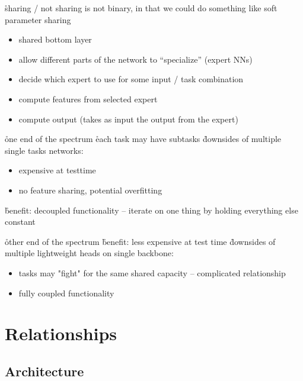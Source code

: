 \r{sharing / not sharing is not binary, in that we could do something like soft parameter sharing}


\begin{itemize}[noitemsep,topsep=0pt]
	\item shared bottom layer
	\item allow different parts of the network to ``specialize'' (expert NNs)
	\item decide which expert to use for some input / task combination
	\item compute features from selected expert
	\item compute output (takes as input the output from the expert)
\end{itemize}



\r{one end of the spectrum}
\r{each task may have subtasks}
\r{downsides of multiple single tasks networks:}
\begin{itemize}[noitemsep,topsep=0pt]
	\item expensive at testtime
	\item no feature sharing, potential overfitting
\end{itemize}

\r{benefit: decoupled functionality -- iterate on one thing by holding everything else constant}

\r{other end of the spectrum}
\r{benefit: less expensive at test time}
\r{downsides of multiple lightweight heads on single backbone:}
\begin{itemize}[noitemsep,topsep=0pt]
	\item tasks may "fight" for the same shared capacity -- complicated relationship
	\item fully coupled functionality
\end{itemize}

\section{Relationships}


\subsection{Architecture}

